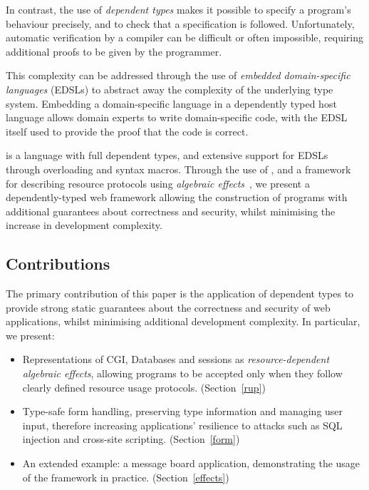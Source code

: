 In contrast, the use of \textit{dependent types} makes it possible
to specify a program's behaviour precisely, and to check that a 
specification is followed.
%
Unfortunately, automatic verification by a compiler can be difficult or
often impossible, requiring additional proofs to be given by the programmer.

This complexity can be addressed through the use of \textit{embedded
domain-specific languages} (EDSLs) to abstract away the complexity of the
underlying type system. Embedding a domain-specific language in
a dependently typed host language
allows domain experts to write 
domain-specific code, with the EDSL itself used to provide the proof that the
code is correct.

\idris{} \cite{brady2013idris} is a language with full dependent types, and
extensive support for EDSLs through overloading and syntax macros. Through the
use of \idris{}, and a framework for describing resource protocols using
\emph{algebraic effects}~\cite{brady:effects}, we
present a dependently-typed web framework allowing the construction of
programs with additional guarantees about correctness and security, whilst
minimising the increase in development complexity. 

\subsection{Contributions}
The primary contribution of this paper is the application of 
dependent types to provide strong static guarantees
about the correctness and security of web applications, whilst minimising
additional development complexity. In particular, we present:

\begin{itemize}
\item Representations of CGI, Databases and sessions as
\textit{resource-dependent algebraic effects}, allowing programs to be accepted
only when they follow clearly defined resource usage protocols. 
(Section~\ref{rup})

\item Type-safe form handling, preserving type information and managing
user input, therefore increasing applications' resilience to attacks such as
SQL injection and cross-site scripting. (Section~\ref{form})

\item An extended example: a message board application, demonstrating the usage
of the framework in practice. (Section~\ref{effects})

\end{itemize}

